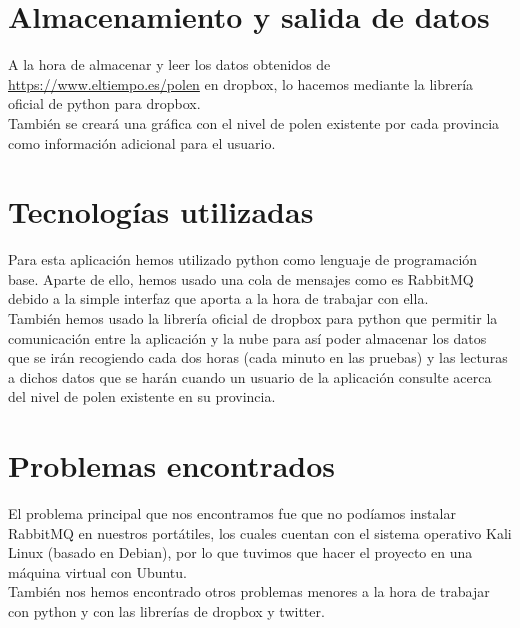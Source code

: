 \documentclass[12pt,letterpaper]{article}
\begin{document}
\section{Almacenamiento y salida de datos}
A la hora de almacenar y leer los datos obtenidos de \url{https://www.eltiempo.es/polen} en dropbox, lo hacemos mediante la librería oficial de python para dropbox.\\

También se creará una gráfica con el nivel de polen existente por cada provincia como información adicional para el usuario.

\section{Tecnologías utilizadas}
Para esta aplicación hemos utilizado python como lenguaje de programación base. Aparte de ello, hemos usado una cola de mensajes como es RabbitMQ debido a la simple interfaz que aporta a la hora de trabajar con ella.\\

También hemos usado la librería oficial de dropbox para python que permitir la comunicación entre la aplicación y la nube para así poder almacenar los datos que se irán recogiendo cada dos horas (cada minuto en las pruebas) y las lecturas a dichos datos que se harán cuando un usuario de la aplicación consulte acerca del nivel de polen existente en su provincia.

\section{Problemas encontrados}
El problema principal que nos encontramos fue que no podíamos instalar RabbitMQ en nuestros portátiles, los cuales cuentan con el sistema operativo Kali Linux (basado en Debian), por lo que tuvimos que hacer el proyecto en una máquina virtual con Ubuntu.\\

También nos hemos encontrado otros problemas menores a la hora de trabajar con python y con las librerías de dropbox y twitter.
\end{document}
